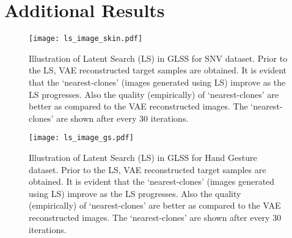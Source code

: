 \documentclass[runningheads]{llncs}
\begin{document}
\begin{table}[h]
\caption{IoU score comparison between BigGAN and VAE when trained on SNV and Hand Gesture datasets. VAE scores better in terms of IoU.}
\begin{center}
\end{center}
\label{tab:vaevsgans}
\end{table} 

\clearpage
\section{Additional Results}

\begin{figure}
\begin{center}
    \texttt{[image: ls\_image\_skin.pdf]}
\caption{Illustration of Latent Search (LS) in GLSS for SNV dataset. Prior to the LS, VAE reconstructed target samples are obtained. It is evident that the `nearest-clones' (images generated using LS) improve as the LS progresses. Also the quality (empirically) of `nearest-clones' are better as compared to the VAE reconstructed images. The `nearest-clones' are shown after every 30 iterations.}
\label{fig:LatentSearch}
\end{center}
\end{figure}
\begin{figure}[h]
\begin{center}
    \texttt{[image: ls\_image\_gs.pdf]}
\caption{Illustration of Latent Search (LS) in GLSS for Hand Gesture dataset. Prior to the LS, VAE reconstructed target samples are obtained. It is evident that the `nearest-clones' (images generated using LS) improve as the LS progresses. Also the quality (empirically) of `nearest-clones' are better as compared to the VAE reconstructed images. The `nearest-clones' are shown after every 30 iterations.}
\label{fig:LatentSearch}
\end{center}
\end{figure}
\end{document}
